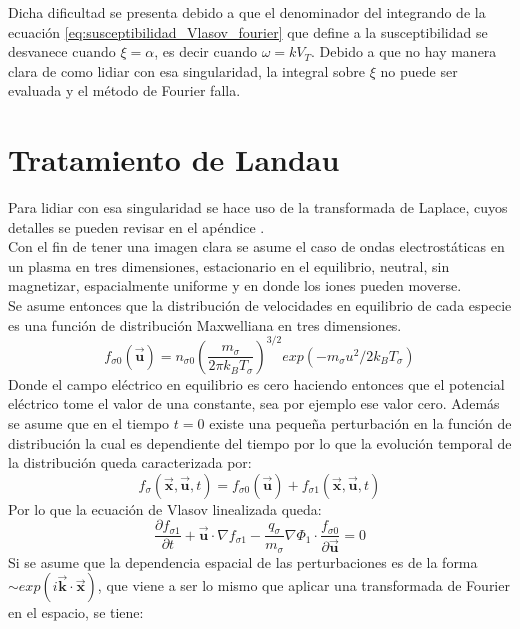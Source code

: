 \documentclass[../tesis_main_file.tex]{subfile}
\begin{document}
Dicha dificultad se presenta debido a que el denominador del integrando de la ecuación \ref{eq:susceptibilidad_Vlasov_fourier} que define a la susceptibilidad se desvanece cuando $\xi=\alpha$, es decir cuando $\omega = kV_T$. Debido a que no hay manera clara de como lidiar con esa singularidad, la integral sobre $\xi$ no puede ser evaluada y el método de Fourier falla.
\section{Tratamiento de Landau}
Para lidiar con esa singularidad se hace uso de la transformada de Laplace, cuyos detalles se pueden revisar en el apéndice \notinsubfile{\ref{Ap:Laplace}}.\\
Con el fin de tener una imagen clara se asume el caso de ondas electrostáticas en un plasma en tres dimensiones, estacionario en el equilibrio, neutral, sin magnetizar, espacialmente uniforme y en donde los iones pueden moverse.\\
Se asume entonces que la distribución de velocidades en equilibrio de cada especie es una función de distribución Maxwelliana en tres dimensiones.
\begin{equation}
\label{eq:dist_max_3D}
f_{\sigma 0}(\overrightarrow{\textbf{u}})=n_{\sigma 0} \left(\frac{m_{\sigma}}{2\pi k_B T_{\sigma}}\right)^{3/2}exp(-m_{\sigma}u^2/2k_BT_{\sigma})
\end{equation}
Donde el campo eléctrico en equilibrio es cero haciendo entonces que el potencial eléctrico tome el valor de una constante, sea por ejemplo ese valor cero. Además se asume que en el tiempo $t=0$ existe una pequeña perturbación en la función de distribución la cual es dependiente del tiempo por lo que la evolución temporal de la distribución queda caracterizada por:
\begin{equation}
f_{\sigma}(\overrightarrow{\textbf{x}},\overrightarrow{\textbf{u}},t)=f_{\sigma 0}(\overrightarrow{\textbf{u}})+f_{\sigma 1}(\overrightarrow{\textbf{x}},\overrightarrow{\textbf{u}},t)
\end{equation}
Por lo que la ecuación de Vlasov linealizada queda:
\begin{equation}
\frac{\partial f_{\sigma 1}}{\partial t}+ \overrightarrow{\textbf{u}} \cdot \nabla f_{\sigma 1} -\frac{q_{\sigma}}{m_{\sigma}}\nabla \Phi _1 \cdot \frac{f_{\sigma 0}}{\partial  \overrightarrow{\textbf{u}}}=0
\end{equation}
Si se asume que la dependencia espacial de las perturbaciones es de la forma $\sim exp(i\overrightarrow{\textbf{k}}\cdot \overrightarrow{\textbf{x}})$, que viene a ser lo mismo que aplicar una transformada de Fourier en el espacio, se tiene:
\end{document}
